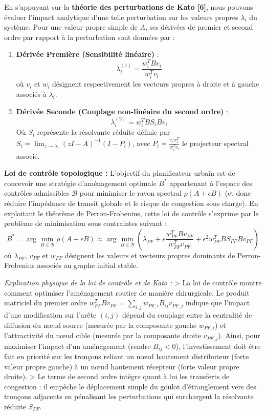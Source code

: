 \documentclass[10pt, a4paper]{article}
\begin{document}
En s'appuyant sur la \textbf{théorie des perturbations de Kato {[}6{]}},
nous pouvons évaluer l'impact analytique d'une telle perturbation sur
les valeurs propres \(\lambda_i\) du système. Pour une valeur propre
simple de \(A\), ses dérivées de premier et second ordre par rapport à
la perturbation sont données par :

\begin{enumerate}
\def\labelenumi{\arabic{enumi}.}
\item
  \textbf{Dérivée Première (Sensibilité linéaire)} :
  \[\lambda_i^{(1)} = \frac{w_i^T B v_i}{w_i^T v_i}\] où \(v_i\) et
  \(w_i\) désignent respectivement les vecteurs propres à droite et à
  gauche associés à \(\lambda_i\).
\item
  \textbf{Dérivée Seconde (Couplage non-linéaire du second ordre)} :
  \[\lambda_i^{(2)} = w_i^T B S_i B v_i\] Où \(S_i\) représente la
  résolvante réduite définie par
  \(S_i = \lim_{z \to \lambda_i} (zI - A)^{-1}(I - P_i)\), avec
  \(P_i = \frac{v_i w_i^T}{w_i^T v_i}\) le projecteur spectral associé.
\end{enumerate}

\textbf{Loi de contrôle topologique :} L'objectif du planificateur
urbain est de concevoir une stratégie d'aménagement optimale \(B^*\)
appartenant à l'espace des contrôles admissibles \(\mathcal{B}\) pour
minimiser le rayon spectral \(\rho(A + \epsilon B)\) (et donc réduire
l'impédance de transit globale et le risque de congestion sous charge).
En exploitant le théorème de Perron-Frobenius, cette loi de contrôle
s'exprime par le problème de minimisation sous contraintes suivant :
\[B^* = \arg\min_{B \in \mathcal{B}} \rho(A + \epsilon B) \approx \arg\min_{B \in \mathcal{B}} \left( \lambda_{PF} + \epsilon \frac{w_{PF}^T B v_{PF}}{w_{PF}^T v_{PF}} + \epsilon^2 w_{PF}^T B S_{PF} B v_{PF} \right)\]
où \(\lambda_{PF}\), \(v_{PF}\) et \(w_{PF}\) désignent les valeurs et
vecteurs propres dominants de Perron-Frobenius associés au graphe
initial stable.

\emph{Explication physique de la loi de contrôle et de Kato :}
\textgreater{} La loi de contrôle montre comment optimiser l'aménagement
routier de manière chirurgicale. Le produit matriciel du premier ordre
\(w_{PF}^T B v_{PF} = \sum_{i,j} w_{PF, i} B_{ij} v_{PF, j}\) indique
que l'impact d'une modification sur l'arête \((i, j)\) dépend du
couplage entre la centralité de diffusion du nœud source (mesurée par la
composante gauche \(w_{PF, i}\)) et l'attractivité du nœud cible
(mesurée par la composante droite \(v_{PF, j}\)). Ainsi, pour maximiser
l'impact d'un aménagement (rendre \(B_{ij} < 0\)), l'investissement doit
être fait en priorité sur les tronçons reliant un nœud hautement
distributeur (forte valeur propre gauche) à un nœud hautement récepteur
(forte valeur propre droite). \textgreater{} Le terme de second ordre
intègre quant à lui les transferts de congestion : il empêche le
déplacement simple du goulot d'étranglement vers des tronçons adjacents
en pénalisant les perturbations qui surchargent la résolvante réduite
\(S_{PF}\).
\end{document}
